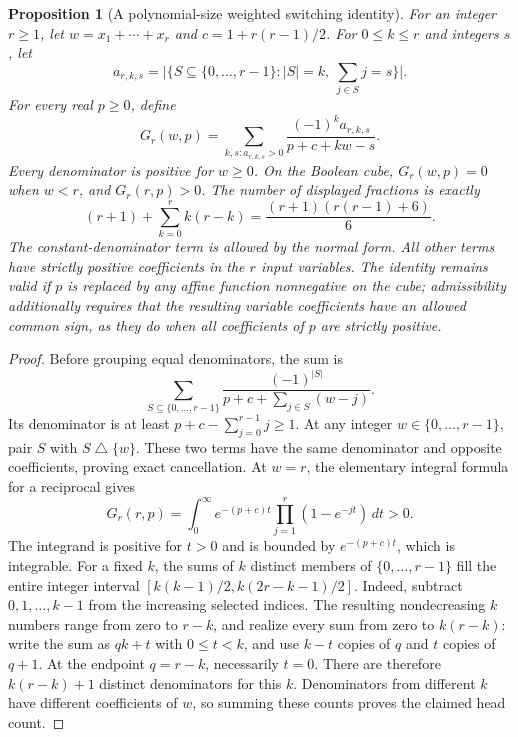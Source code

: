 \documentclass[11pt]{article}
\newtheorem{proposition}{Proposition}
\begin{document}
\begin{proposition}[A polynomial-size weighted switching identity]
For an integer $r\geq1$, let $w=x_1+\cdots+x_r$ and
$c=1+r(r-1)/2$. For $0\leq k\leq r$ and integers $s$, let
\[
 a_{r,k,s}=\bigl|\{S\subseteq\{0,\ldots,r-1\}:|S|=k,
                                  \ \sum_{j\in S}j=s\}\bigr|.
\]
For every real $p\geq0$, define
\[
 G_r(w,p)=\sum_{k,s:a_{r,k,s}>0}
          \frac{(-1)^k a_{r,k,s}}{p+c+kw-s}.
\]
Every denominator is positive for $w\geq0$. On the Boolean cube,
$G_r(w,p)=0$ when $w<r$, and $G_r(r,p)>0$.
The number of displayed fractions is exactly
\[
 (r+1)+\sum_{k=0}^r k(r-k)
       =\frac{(r+1)(r(r-1)+6)}6.
\]
The constant-denominator term is allowed by the normal form. All other
terms have strictly positive coefficients in the $r$ input variables.
The identity remains valid if $p$ is replaced by any affine function
nonnegative on the cube; admissibility additionally requires that the
resulting variable coefficients have an allowed common sign, as they
do when all coefficients of $p$ are strictly positive.
\end{proposition}
\begin{proof}
Before grouping equal denominators, the sum is
\[
 \sum_{S\subseteq\{0,\ldots,r-1\}}
 \frac{(-1)^{|S|}}{p+c+\sum_{j\in S}(w-j)}.
\]
Its denominator is at least $p+c-\sum_{j=0}^{r-1}j\geq1$.
At any integer $w\in\{0,\ldots,r-1\}$, pair $S$ with
$S\mathbin{\triangle}\{w\}$. These two terms have the same
denominator and opposite coefficients, proving exact cancellation.
At $w=r$, the elementary integral formula for a reciprocal gives
\[
 G_r(r,p)=\int_0^\infty e^{-(p+c)t}
                    \prod_{j=1}^r(1-e^{-jt})\,dt>0.
\]
The integrand is positive for $t>0$ and is bounded by
$e^{-(p+c)t}$, which is integrable.
For a fixed $k$, the sums of $k$ distinct members of
$\{0,\ldots,r-1\}$ fill the entire integer interval
$[k(k-1)/2,k(2r-k-1)/2]$.
Indeed, subtract $0,1,\ldots,k-1$ from the increasing selected
indices. The resulting nondecreasing $k$ numbers range from zero to
$r-k$, and realize every sum from zero to $k(r-k)$: write the
sum as $qk+t$ with $0\leq t<k$, and use $k-t$ copies of $q$ and
$t$ copies of $q+1$. At the endpoint $q=r-k$, necessarily $t=0$.
There are therefore $k(r-k)+1$ distinct denominators for this $k$.
Denominators from different $k$ have different coefficients of $w$,
so summing these counts proves the claimed head count.
\end{proof}
\end{document}
